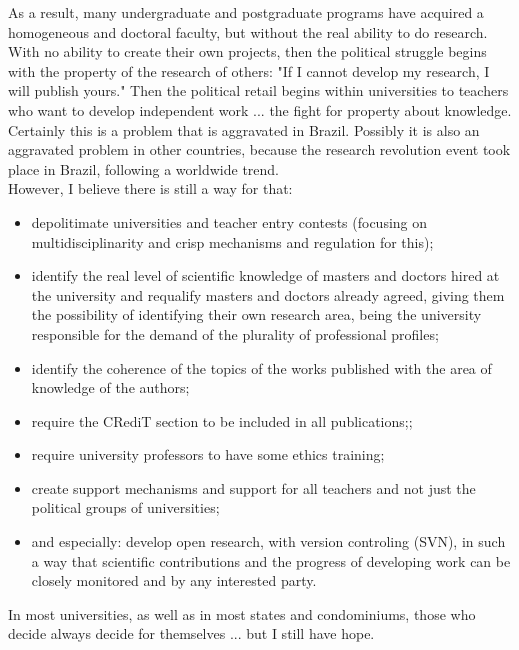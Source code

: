 \documentclass[11pt]{book}
\begin{document}
\noindent As a result, many undergraduate and postgraduate programs have acquired a homogeneous and doctoral faculty, but without the real ability to do research. \\

 \noindent With no ability to create their own projects, then the political struggle begins with the property of the research of others: "If I cannot develop my research, I will publish yours." Then the political retail begins within universities to teachers who want to develop independent work ... the fight for property about knowledge. \\
 
 \noindent Certainly this is a problem that is aggravated in Brazil. Possibly it is also an aggravated problem in other countries, because the research revolution event took place in Brazil, following a worldwide trend. \\
 
 \noindent However, I believe there is still a way for that:
 
 \begin{itemize}
 \item depolitimate universities and teacher entry contests (focusing on multidisciplinarity and crisp mechanisms and regulation for this);
 \item identify the real level of scientific knowledge of masters and doctors hired at the university and requalify masters and doctors already agreed, giving them the possibility of identifying their own research area, being the university responsible for the demand of the plurality of professional profiles;
 \item identify the coherence of the topics of the works published with the area of knowledge of the authors;
 \item require the CRediT section to be included in all publications;;
 \item require university professors to have some ethics training;
 \item create support mechanisms and support for all teachers and not just the political groups of universities;
 \item and especially: develop open research, with version controling (SVN), in such a way that scientific contributions and the progress of developing work can be closely monitored and by any interested party.
 \end{itemize}
 
 \noindent In most universities, as well as in most states and condominiums, those who decide always decide for themselves ... but I still have hope.
 
\end{document}
